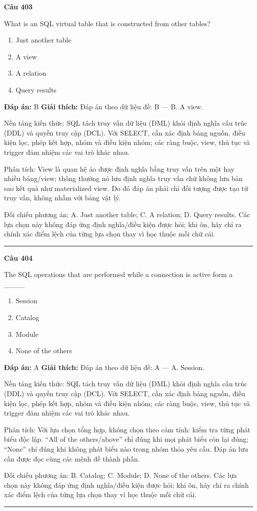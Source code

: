 \documentclass[11pt,a4paper]{article}
\newenvironment{question}[1]{%
  \par\vspace{1em}\noindent\textbf{\large Câu #1}\par\vspace{0.4em}
}{%
  \par\vspace{1em}\hrule\vspace{0.6em}
}
\newenvironment{choices}{%
  \begin{enumerate}[label=\textbf{\Alph*.},leftmargin=2.2em,itemsep=2pt,topsep=3pt]
}{%
  \end{enumerate}
}
\newcommand{\choice}{\item}
\begin{document}
\begin{question}{403}
What is an SQL virtual table that is constructed from other tables?
\begin{choices}
\choice Just another table
\choice A view
\choice A relation
\choice Query results
\end{choices}
\textbf{Đáp án:} B
\textbf{Giải thích:} Đáp án theo dữ liệu đề: B — B. A view.

Nền tảng kiến thức: SQL tách truy vấn dữ liệu (DML) khỏi định nghĩa cấu trúc (DDL) và quyền truy cập (DCL). Với SELECT, cần xác định bảng nguồn, điều kiện lọc, phép kết hợp, nhóm và điều kiện nhóm; các ràng buộc, view, thủ tục và trigger đảm nhiệm các vai trò khác nhau.

Phân tích: View là quan hệ ảo được định nghĩa bằng truy vấn trên một hay nhiều bảng/view; thông thường nó lưu định nghĩa truy vấn chứ không lưu bản sao kết quả như materialized view. Do đó đáp án phải chỉ đối tượng được tạo từ truy vấn, không nhầm với bảng vật lý.

Đối chiếu phương án: A. Just another table; C. A relation; D. Query results. Các lựa chọn này không đáp ứng định nghĩa/điều kiện được hỏi; khi ôn, hãy chỉ ra chính xác điểm lệch của từng lựa chọn thay vì học thuộc mỗi chữ cái.
\end{question}

\begin{question}{404}
The SQL operations that are performed while a connection is active form a ____
\begin{choices}
\choice Session
\choice Catalog
\choice Module
\choice None of the others
\end{choices}
\textbf{Đáp án:} A
\textbf{Giải thích:} Đáp án theo dữ liệu đề: A — A. Session.

Nền tảng kiến thức: SQL tách truy vấn dữ liệu (DML) khỏi định nghĩa cấu trúc (DDL) và quyền truy cập (DCL). Với SELECT, cần xác định bảng nguồn, điều kiện lọc, phép kết hợp, nhóm và điều kiện nhóm; các ràng buộc, view, thủ tục và trigger đảm nhiệm các vai trò khác nhau.

Phân tích: Với lựa chọn tổng hợp, không chọn theo cảm tính: kiểm tra từng phát biểu độc lập. “All of the others/above” chỉ đúng khi mọi phát biểu còn lại đúng; “None” chỉ đúng khi không phát biểu nào trong nhóm thỏa yêu cầu. Đáp án lưu cần được đọc cùng các mệnh đề thành phần.

Đối chiếu phương án: B. Catalog; C. Module; D. None of the others. Các lựa chọn này không đáp ứng định nghĩa/điều kiện được hỏi; khi ôn, hãy chỉ ra chính xác điểm lệch của từng lựa chọn thay vì học thuộc mỗi chữ cái.
\end{question}
\end{document}
